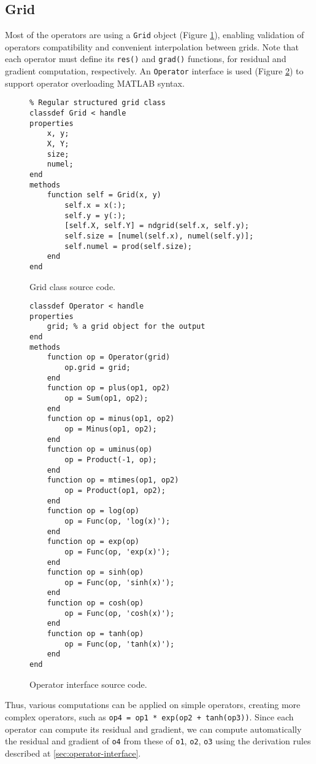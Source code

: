 \documentclass[MSc,beforeExam]{iitcsthesis}
\begin{document}
\subsection{Grid}
Most of the operators are using a \verb|Grid| object (Figure \ref{fig:grid.m}),
enabling validation of operators compatibility and 
convenient interpolation between grids. Note that
each operator must define its \verb|res()| and \verb|grad()|
functions, for residual and gradient computation, respectively.
An \verb|Operator| interface is used (Figure \ref{fig:operator.m}) 
to support operator overloading MATLAB syntax.
\begin{figure}[h]
\begin{verbatim}
% Regular structured grid class
classdef Grid < handle
properties
    x, y;
    X, Y;
    size;    
    numel;
end
methods
    function self = Grid(x, y)
        self.x = x(:);
        self.y = y(:);
        [self.X, self.Y] = ndgrid(self.x, self.y);
        self.size = [numel(self.x), numel(self.y)];
        self.numel = prod(self.size);
    end
end
\end{verbatim}
\caption{Grid class source code.} \label{fig:grid.m}
\end{figure}
\begin{figure}[h]
\begin{verbatim}
classdef Operator < handle
properties
    grid; % a grid object for the output
end
methods
    function op = Operator(grid)
        op.grid = grid;
    end
    function op = plus(op1, op2)
        op = Sum(op1, op2);
    end
    function op = minus(op1, op2)
        op = Minus(op1, op2);
    end
    function op = uminus(op)
        op = Product(-1, op);
    end
    function op = mtimes(op1, op2)
        op = Product(op1, op2);
    end
    function op = log(op)
        op = Func(op, 'log(x)');
    end
    function op = exp(op)
        op = Func(op, 'exp(x)');
    end
    function op = sinh(op)
        op = Func(op, 'sinh(x)');
    end
    function op = cosh(op)
        op = Func(op, 'cosh(x)');
    end
    function op = tanh(op)
        op = Func(op, 'tanh(x)');
    end
end
\end{verbatim}
\caption{Operator interface source code.} \label{fig:operator.m}
\end{figure}

Thus, various computations can be applied on simple operators, 
creating more complex operators, such as
\verb|op4 = op1 * exp(op2 + tanh(op3))|. 
Since each operator can compute its residual and gradient, we
can compute automatically the residual and gradient of \verb|o4|
from these of \verb|o1|, \verb|o2|, \verb|o3| using the derivation
rules described at \ref{sec:operator-interface}.
\end{document}
